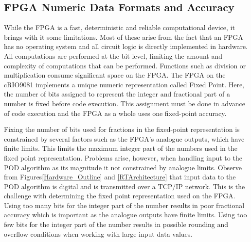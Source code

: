 \documentclass[journal]{IEEEtran}
\begin{document}
\subsection{FPGA Numeric Data Formats and Accuracy}

While the FPGA is a fast, deterministic and reliable computational device, it brings with it some limitations. Most of these arise from the fact that an FPGA has no operating system and all circuit logic is directly implemented in hardware. All computations are performed at the bit level, limiting the amount and complexity of computations that can be performed. Functions such as division or multiplication consume significant space on the FPGA\cite{LabViewManuals}. The FPGA on the cRIO9081 implements a unique numeric representation called Fixed Point\cite{LabViewManuals}. Here, the number of bits assigned to represent the integer and fractional part of a number is fixed before code execution\cite{LabViewManuals}. This assignment must be done in advance of code execution and the FPGA as a whole uses one fixed-point accuracy.


Fixing the number of bits used for fractions in the fixed-point representation is constrained by several factors such as the FPGA\rq{s} analogue outputs, which have finite limits. This limits the maximum integer part of the numbers used in the fixed point representation. Problems arise, however, when handling input to the POD algorithm as its magnitude it not constrained by analogue limits. Observe from Figures\ref{Hardware_Outline} and \ref{RTArchitecture} that input data to the POD algorithm is digital and is transmitted over a TCP/IP network. This is the challenge with determining the fixed point representation used on the FPGA. Using too many bits for the integer part of the number results in poor fractional accuracy which is important as the analogue outputs have finite limits. Using too few bits for the integer part of the number results in possible rounding and overflow conditions when working with large input data values.

\end{document}
